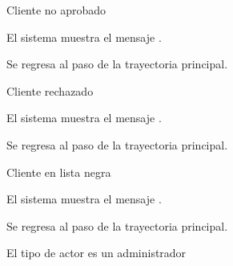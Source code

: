 {\begin{trayectoriaAlternativa}
  \end{trayectoriaAlternativa}


  \begin{trayectoriaAlternativa}
    {Cliente no aprobado}

    \item El sistema muestra el mensaje
      .

    \item Se regresa al paso  de la trayectoria
      principal.

  \end{trayectoriaAlternativa}


  \begin{trayectoriaAlternativa}
    {Cliente rechazado}

    \item El sistema muestra el mensaje
      .

    \item Se regresa al paso  de la trayectoria
      principal.

  \end{trayectoriaAlternativa}


  \begin{trayectoriaAlternativa}
    {Cliente en lista negra}

    \item El sistema muestra el mensaje
      .

    \item Se regresa al paso  de la trayectoria
      principal.

  \end{trayectoriaAlternativa}


  \begin{trayectoriaAlternativa}[ta:administrador]
    {El tipo de actor es un administrador}


\end{trayectoriaAlternativa}}
